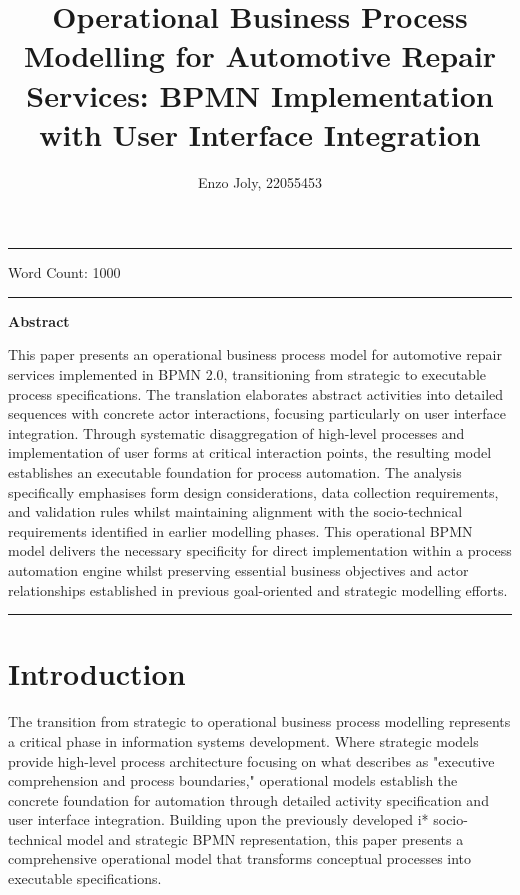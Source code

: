 \documentclass[14pt,a4paper]{article}
\title{Operational Business Process Modelling for Automotive Repair Services: BPMN Implementation with User Interface Integration}
\author{Enzo Joly, 22055453}
\date{}
\begin{document}
\maketitle

\hrule

\vspace{3em}

Word Count: 1000

\vspace{3em}
\hrule

\vspace{2em}
\textbf{Abstract}
\vspace{1em}

This paper presents an operational business process model for automotive repair services implemented in BPMN 2.0, transitioning from strategic to executable process specifications. The translation elaborates abstract activities into detailed sequences with concrete actor interactions, focusing particularly on user interface integration. Through systematic disaggregation of high-level processes and implementation of user forms at critical interaction points, the resulting model establishes an executable foundation for process automation. The analysis specifically emphasises form design considerations, data collection requirements, and validation rules whilst maintaining alignment with the socio-technical requirements identified in earlier modelling phases. This operational BPMN model delivers the necessary specificity for direct implementation within a process automation engine whilst preserving essential business objectives and actor relationships established in previous goal-oriented and strategic modelling efforts.

\vspace{3em}
\hrule

\thispagestyle{empty}

\newpage

\tableofcontents
{}

\newpage


\section{Introduction}

The transition from strategic to operational business process modelling represents a critical phase in information systems development. Where strategic models provide high-level process architecture focusing on what \textit{\parencite[p. 213]{Allweyer2016}} describes as "executive comprehension and process boundaries," operational models establish the concrete foundation for automation through detailed activity specification and user interface integration. Building upon the previously developed i* socio-technical model and strategic BPMN representation, this paper presents a comprehensive operational model that transforms conceptual processes into executable specifications.
\end{document}
